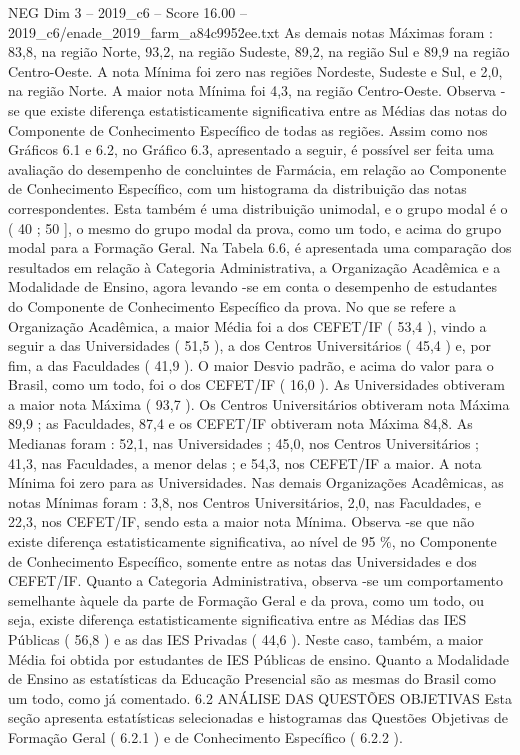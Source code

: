 \begin{textsample}{NEG Dim 3 – 2019\_c6 – Score 16.00 – 2019\_c6/enade\_2019\_farm\_a84c9952ee.txt}
As demais notas Máximas foram : 83,8, na região Norte, 93,2, na região Sudeste, 89,2, na região Sul e 89,9 na região Centro-Oeste.
A nota Mínima foi zero nas regiões Nordeste, Sudeste e Sul, e 2,0, na região Norte.
A maior nota Mínima foi 4,3, na região Centro-Oeste.
Observa -se que existe diferença estatisticamente significativa entre as Médias das notas do Componente de Conhecimento Específico de todas as regiões.
Assim como nos Gráficos 6.1 e 6.2, no Gráfico 6.3, apresentado a seguir, é possível ser feita uma avaliação do desempenho de concluintes de Farmácia, em relação ao Componente de Conhecimento Específico, com um histograma da distribuição das notas correspondentes.
Esta também é uma distribuição unimodal, e o grupo modal é o ( 40 ; 50 ], o mesmo do grupo modal da prova, como um todo, e acima do grupo modal para a Formação Geral.
Na Tabela 6.6, é apresentada uma comparação dos resultados em relação à Categoria Administrativa, a Organização Acadêmica e a Modalidade de Ensino, agora levando -se em conta o desempenho de estudantes do Componente de Conhecimento Específico da prova.
No que se refere a Organização Acadêmica, a maior Média foi a dos CEFET/IF ( 53,4 ), vindo a seguir a das Universidades ( 51,5 ), a dos Centros Universitários ( 45,4 ) e, por fim, a das Faculdades ( 41,9 ).
O maior Desvio padrão, e acima do valor para o Brasil, como um todo, foi o dos CEFET/IF ( 16,0 ).
As Universidades obtiveram a maior nota Máxima ( 93,7 ).
Os Centros Universitários obtiveram nota Máxima 89,9 ; as Faculdades, 87,4 e os CEFET/IF obtiveram nota Máxima 84,8.
As Medianas foram : 52,1, nas Universidades ; 45,0, nos Centros Universitários ; 41,3, nas Faculdades, a menor delas ; e 54,3, nos CEFET/IF a maior.
A nota Mínima foi zero para as Universidades.
Nas demais Organizações Acadêmicas, as notas Mínimas foram : 3,8, nos Centros Universitários, 2,0, nas Faculdades, e 22,3, nos CEFET/IF, sendo esta a maior nota Mínima.
Observa -se que não existe diferença estatisticamente significativa, ao nível de 95 \%, no Componente de Conhecimento Específico, somente entre as notas das Universidades e dos CEFET/IF.
Quanto a Categoria Administrativa, observa -se um comportamento semelhante àquele da parte de Formação Geral e da prova, como um todo, ou seja, existe diferença estatisticamente significativa entre as Médias das IES Públicas ( 56,8 ) e as das IES Privadas ( 44,6 ).
Neste caso, também, a maior Média foi obtida por estudantes de IES Públicas de ensino.
Quanto a Modalidade de Ensino as estatísticas da Educação Presencial são as mesmas do Brasil como um todo, como já comentado. 6.2 ANÁLISE DAS QUESTÕES OBJETIVAS Esta seção apresenta estatísticas selecionadas e histogramas das Questões Objetivas de Formação Geral ( 6.2.1 ) e de Conhecimento Específico ( 6.2.2 ).

\end{textsample}
